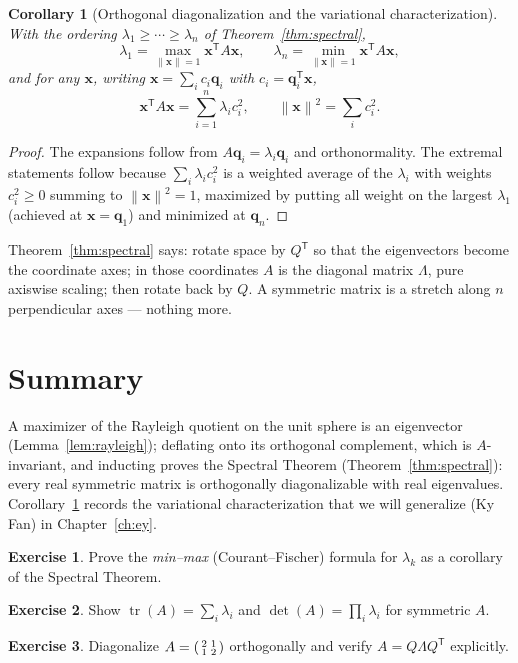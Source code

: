 \documentclass[11pt,oneside]{book}
\theoremstyle{plain}
\newtheorem{corollary}[theorem]{Corollary}
\theoremstyle{definition}
\newtheorem{exercise}{Exercise}[chapter]
\theoremstyle{remark}
\newcommand{\tr}{\operatorname{tr}}
\newcommand{\norm}[1]{\left\lVert #1 \right\rVert}
\newcommand{\T}{^{\mathsf T}}
\newcommand{\bx}{\mathbf{x}}
\newcommand{\bq}{\mathbf{q}}
\begin{document}
\begin{corollary}[Orthogonal diagonalization and the variational characterization]
\label{cor:rayleigh}
With the ordering $\lambda_1\ge\cdots\ge\lambda_n$ of Theorem~\ref{thm:spectral},
\[
\lambda_1=\max_{\norm{\bx}=1}\bx\T A\bx,\qquad
\lambda_n=\min_{\norm{\bx}=1}\bx\T A\bx,
\]
and for any $\bx$, writing $\bx=\sum_i c_i\bq_i$ with $c_i=\bq_i\T\bx$,
\[
\bx\T A\bx=\sum_{i=1}^n\lambda_i c_i^2,\qquad \norm{\bx}^2=\sum_i c_i^2 .
\]
\end{corollary}
\begin{proof}
The expansions follow from $A\bq_i=\lambda_i\bq_i$ and orthonormality. The extremal
statements follow because $\sum_i\lambda_i c_i^2$ is a weighted average of the
$\lambda_i$ with weights $c_i^2\ge0$ summing to $\norm{\bx}^2=1$, maximized by putting
all weight on the largest $\lambda_1$ (achieved at $\bx=\bq_1$) and minimized at
$\bq_n$.
\end{proof}

\begin{geometry_box}
Theorem~\ref{thm:spectral} says: rotate space by $Q\T$ so that the eigenvectors become
the coordinate axes; in those coordinates $A$ is the diagonal matrix $\Lambda$, pure
axiswise scaling; then rotate back by $Q$. A symmetric matrix is a stretch along $n$
perpendicular axes --- nothing more.
\end{geometry_box}

\section*{Summary}
A maximizer of the Rayleigh quotient on the unit sphere is an eigenvector
(Lemma~\ref{lem:rayleigh}); deflating onto its orthogonal complement, which is
$A$-invariant, and inducting proves the Spectral Theorem
(Theorem~\ref{thm:spectral}): every real symmetric matrix is orthogonally diagonalizable
with real eigenvalues. Corollary~\ref{cor:rayleigh} records the variational
characterization that we will generalize (Ky Fan) in Chapter~\ref{ch:ey}.

\begin{exercise}
Prove the \emph{min--max} (Courant--Fischer) formula for $\lambda_k$ as a corollary of
the Spectral Theorem.
\end{exercise}
\begin{exercise}
Show $\tr(A)=\sum_i\lambda_i$ and $\det(A)=\prod_i\lambda_i$ for symmetric $A$.
\end{exercise}
\begin{exercise}
Diagonalize $A=\begin{psmallmatrix}2&1\\1&2\end{psmallmatrix}$ orthogonally and verify
$A=Q\Lambda Q\T$ explicitly.
\end{exercise}
\end{document}
